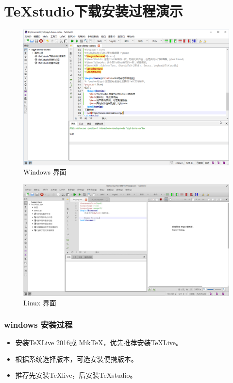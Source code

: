 \documentclass[14pt,notheorems]{beamer}
\begin{document}
\section{\TeX studio下载安装过程演示}
\begin{frame}
	\begin{figure}
		\centering
		\includegraphics[width=1.00\linewidth]{TeXstudio_Windows}
		\caption{Windows 界面}
		\label{fig:texstudiowindows}
	\end{figure}
	
\end{frame}
\begin{frame}
\begin{figure}
	\centering
	\includegraphics[width=1.0\linewidth]{TeXstudio_linux}
	\caption{Linux 界面}
	\label{fig:texstudiolinux}
\end{figure}
\end{frame}
\begin{frame}
	\frametitle{windows 安装过程}
	\begin{itemize}
		\item 安装TeXLive 2016或 MikTeX，优先推荐安装TeXLive。
		\item 根据系统选择版本，可选安装便携版本。
		\item 推荐先安装TeXlive，后安装TeXstudio。
	\end{itemize}
\end{frame}
\end{document}
